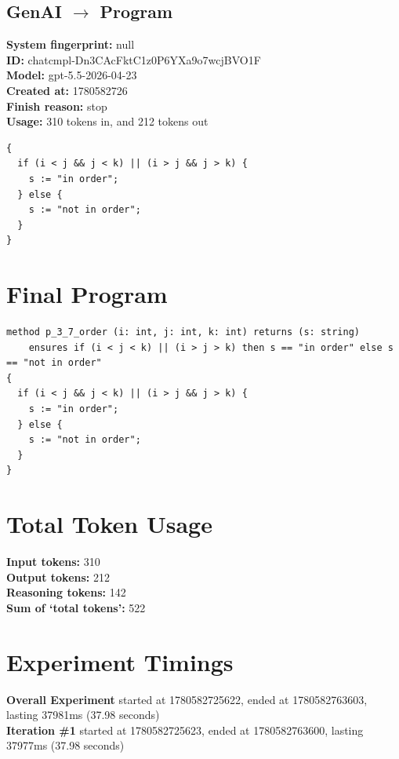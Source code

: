 \documentclass{article}
\begin{document}
\subsection*{GenAI $\rightarrow$ Program}
\textbf{System fingerprint: }null
\\\textbf{ID: }chatcmpl-Dn3CAcFktC1z0P6YXa9o7wcjBVO1F
\\\textbf{Model: }gpt-5.5-2026-04-23
\\\textbf{Created at: }1780582726
\\\textbf{Finish reason: }stop
\\\textbf{Usage: }310 tokens in, and 212 tokens out
\begin{lstlisting}
{
  if (i < j && j < k) || (i > j && j > k) {
    s := "in order";
  } else {
    s := "not in order";
  }
}
\end{lstlisting}
\section*{Final Program}
\begin{lstlisting}
method p_3_7_order (i: int, j: int, k: int) returns (s: string)
	ensures if (i < j < k) || (i > j > k) then s == "in order" else s == "not in order"
{
  if (i < j && j < k) || (i > j && j > k) {
    s := "in order";
  } else {
    s := "not in order";
  }
}
\end{lstlisting}
\section*{Total Token Usage}
\textbf{Input tokens: }310
\\\textbf{Output tokens: }212
\\\textbf{Reasoning tokens: }142
\\\textbf{Sum of `total tokens': }522
\section*{Experiment Timings}
\textbf{Overall Experiment} started at 1780582725622, ended at 1780582763603, lasting 37981ms (37.98 seconds)
\\\textbf{Iteration \#1} started at 1780582725623, ended at 1780582763600, lasting 37977ms (37.98 seconds)
\end{document}
